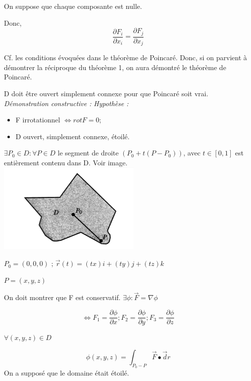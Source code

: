  On suppose que chaque composante est nulle.

 Donc,
 \[\frac{\partial F_i}{\partial x_i}=\frac{\partial F_j}{\partial x_j}\]


Cf. les conditions évoquées dans le théorème de Poincaré. Donc, si on parvient à démontrer la réciproque du théorème 1, on aura démontré le théorème de Poincaré.

D doit être ouvert simplement connexe pour que Poincaré soit vrai.\\




\textit{
Démonstration constructive :}
\textit{
Hypothèse :}

\begin{itemize}
\item F  irrotationnel $\Leftrightarrow rot F =0$;
\item D ouvert, simplement connexe, étoilé.
\end{itemize}

\begin{mydef}

$\exists P_0 \in D : \forall P \in D $ le segment de droite $(P_0+t( P-P_0))$, avec $t\in [0,1]$ est entièrement contenu dans D. Voir image.\\

\includegraphics[scale=1]{image2.png}\\
\end{mydef}

$P_0 = (0,0,0)$ ; $\vec r(t) = (tx)i + (ty) j +(tz) k$

$P=(x,y,z)$

On doit montrer que F est conservatif. $\exists \phi : \vec F = \nabla \phi $

\[\Leftrightarrow F_1=\frac{\partial \phi}{\partial x}; F_2=\frac{\partial \phi}{\partial y};F_3=\frac{\partial \phi}{\partial z}\]

$\forall(x,y,z)\in D$

\[\phi(x,y,z) = \int_{P_0-P} \vec F \bullet \vec dr \] On a supposé que le domaine était étoilé.

